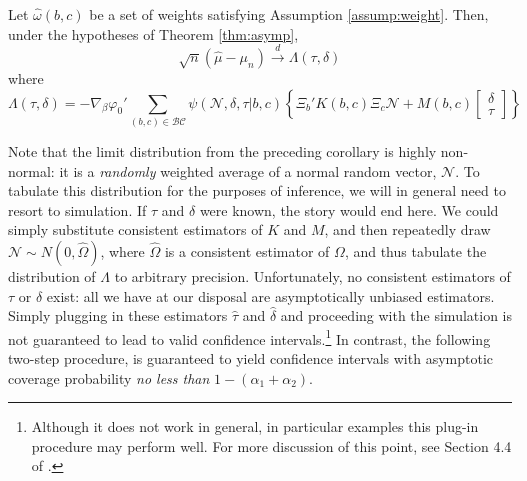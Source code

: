 \begin{cor}
Let $\widehat{\omega}(b,c)$ be a set of weights satisfying Assumption \ref{assump:weight}. Then, under the hypotheses of Theorem \ref{thm:asymp},  
	$$\sqrt{n}\left(\widehat{\mu} - \mu_n\right) \overset{d}{\rightarrow} \Lambda(\tau,\delta)$$
where
	\begin{equation}
		\Lambda(\tau,\delta) = -\nabla_\beta\varphi_0' \sum_{(b,c) \in \mathcal{BC}} \psi(\mathscr{N},\delta, \tau|b,c) \left\{\Xi_b' K(b,c) \Xi_c \mathscr{N} + M(b,c)  \left[\begin{array}{c}\delta \\ \tau \end{array} \right]\right\}
	\end{equation}
\end{cor}
Note that the limit distribution from the preceding corollary is highly non-normal: it is a \emph{randomly} weighted average of a normal random vector, $\mathscr{N}$.
To tabulate this distribution for the purposes of inference, we will in general need to resort to simulation.
If $\tau$ and $\delta$ were known, the story would end here.
We could simply substitute consistent estimators of $K$ and $M$, and then repeatedly draw $\mathscr{N} \sim N(0, \widehat{\Omega})$, where $\widehat{\Omega}$ is a consistent estimator of $\Omega$, and thus tabulate the distribution of $\Lambda$ to arbitrary precision. 
Unfortunately, no consistent estimators of $\tau$ or $\delta$ exist: all we have at our disposal are asymptotically unbiased estimators.
Simply plugging in these estimators $\widehat{\tau}$ and $\widehat{\delta}$ and proceeding with the simulation is not guaranteed to lead to valid confidence intervals.\footnote{Although it does not work in general, in particular examples this plug-in procedure may perform well. For more discussion of this point, see Section 4.4 of \cite{DiTraglia2012}.}
In contrast, the following two-step procedure, is guaranteed to yield confidence intervals with asymptotic coverage probability \emph{no less than} $1-(\alpha_1 + \alpha_2)$.


